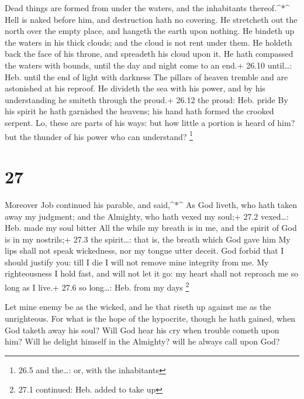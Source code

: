  Dead things are formed from under the waters, and the
inhabitants thereof.\^{}*\^{}  Hell is naked before him, and
destruction hath no covering.  He stretcheth out the north
over the empty place, and hangeth the earth upon nothing. 
He bindeth up the waters in his thick clouds; and the cloud is not rent
under them.  He holdeth back the face of his throne, and
spreadeth his cloud upon it.  He hath compassed the waters
with bounds, until the day and night come to an end.+ 26.10 until\ldots:
Heb. until the end of light with darkness  The pillars of
heaven tremble and are astonished at his reproof.  He
divideth the sea with his power, and by his understanding he smiteth
through the proud.+ 26.12 the proud: Heb. pride  By his
spirit he hath garnished the heavens; his hand hath formed the crooked
serpent.  Lo, these are parts of his ways: but how little a
portion is heard of him? but the thunder of his power who can
understand? \footnote{26.5 and the\ldots: or, with the inhabitants}

\hypertarget{section-26}{%
\section{27}\label{section-26}}

 Moreover Job continued his parable, and said,\^{}*\^{}
 As God liveth, who hath taken away my judgment; and the
Almighty, who hath vexed my soul;+ 27.2 vexed\ldots: Heb. made my soul
bitter  All the while my breath is in me, and the spirit of
God is in my nostrils;+ 27.3 the spirit\ldots: that is, the breath which
God gave him  My lips shall not speak wickedness, nor my
tongue utter deceit.  God forbid that I should justify you:
till I die I will not remove mine integrity from me.  My
righteousness I hold fast, and will not let it go: my heart shall not
reproach me so long as I live.+ 27.6 so long\ldots: Heb. from my days
\footnote{27.1 continued: Heb. added to take up}

 Let mine enemy be as the wicked, and he that riseth up
against me as the unrighteous.  For what is the hope of the
hypocrite, though he hath gained, when God taketh away his soul?
 Will God hear his cry when trouble cometh upon him?
 Will he delight himself in the Almighty? will he always
call upon God?

